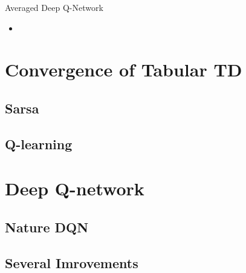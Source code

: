 \documentclass{beamer}
\begin{document}
\begin{frame}{Averaged Deep Q-Network}
	\begin{itemize}
		\item 
	\end{itemize}
\end{frame}


\section{Convergence of Tabular TD}
\subsection{Sarsa}
\subsection{Q-learning}




\section{Deep Q-network}

\subsection{Nature DQN}
\subsection{Several Imrovements}
\end{document}

